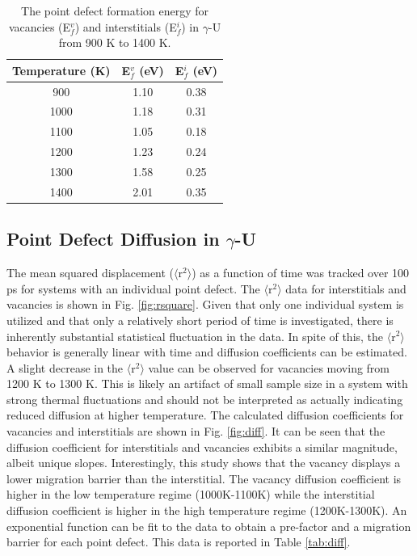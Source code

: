 \documentclass[review]{elsarticle}
\begin{document}
\begin{table}[h]
\caption{The point defect formation energy for vacancies (E$_{f}^{v}$) and interstitials (E$_{f}^{i}$) in $\gamma$-U from 900 K to 1400 K.} \label{tab:defs}
\begin{center}
\begin{tabular}{|c|c|c|}
	\hline
	Temperature (K) & E$_{f}^{v}$ (eV) & E$_{f}^{i}$ (eV) \\
	 \hline
  	   900 & 1.10 & 0.38 \\
	 1000 & 1.18 & 0.31 \\
	 1100 & 1.05 & 0.18 \\
	 1200 & 1.23 & 0.24 \\
	 1300 & 1.58 & 0.25 \\
	 1400 & 2.01 & 0.35 \\
	 \hline
\end{tabular}
\end{center}
\label{default}
\end{table}

\FloatBarrier

\subsection{Point Defect Diffusion in $\gamma$-U}

The mean squared displacement ($\langle$r$^2$$\rangle$) as a function of time was tracked over 100 ps for systems with an individual point defect. The $\langle$r$^2$$\rangle$ data for interstitials and vacancies is shown in Fig. \ref{fig:rsquare}. Given that only one individual system is utilized and that only a relatively short period of time is investigated, there is inherently substantial statistical fluctuation in the data. In spite of this, the $\langle$r$^2$$\rangle$ behavior is generally linear with time and diffusion coefficients can be estimated. A slight decrease in the $\langle$r$^2$$\rangle$ value can be observed for vacancies moving from 1200 K to 1300 K. This is likely an artifact of small sample size in a system with strong thermal fluctuations and should not be interpreted as actually indicating reduced diffusion at higher temperature. The calculated diffusion coefficients for vacancies and interstitials are shown in Fig. \ref{fig:diff}. It can be seen that the diffusion coefficient for interstitials and vacancies exhibits a similar magnitude, albeit unique slopes. Interestingly, this study shows that the vacancy displays a lower migration barrier than the interstitial. The vacancy diffusion coefficient is higher in the low temperature regime (1000K-1100K) while the interstitial diffusion coefficient is higher in the high temperature regime (1200K-1300K).  An exponential function can be fit to the data to obtain a pre-factor and a migration barrier for each point defect. This data is reported in Table \ref{tab:diff}. 
\end{document}
